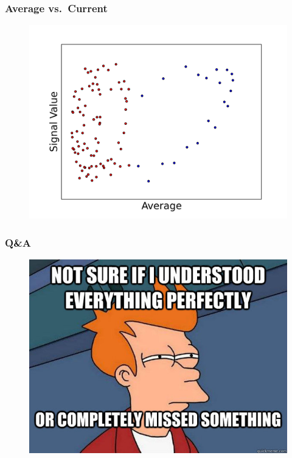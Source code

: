 \documentclass{beamer}
\begin{document}
  \begin{frame}[foot]
    \frametitle{Average vs.\ Current} 
    \begin{figure}
      \includegraphics[scale=.5]{./gfx/f1f5.png}
    \end{figure}
  \end{frame}

  \begin{frame}[foot]
    \frametitle{Q\&A}
    \begin{figure}
      \includegraphics[scale=.5]{./gfx/futurama-fry-meme-00020.jpg}
    \end{figure}
  \end{frame}


\end{document}
